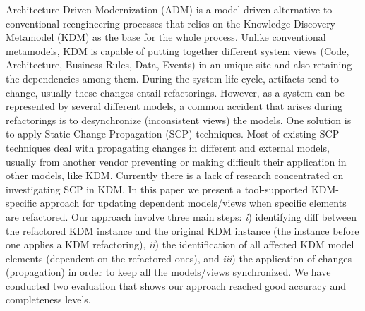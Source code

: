 %
Architecture-Driven Modernization (ADM) is a model-driven alternative to conventional reengineering processes that relies on the Knowledge-Discovery Metamodel (KDM) as the base for the whole process. Unlike conventional metamodels, KDM is capable of putting together different system views (Code, Architecture, Business Rules, Data, Events) in an unique site and also retaining the dependencies among them. During the system life cycle, artifacts tend to change, usually these changes entail refactorings. However, as a system can be represented by several different models, a common accident that arises during refactorings is to desynchronize (inconsistent views) the models. One solution is to apply Static Change Propagation (SCP) techniques. Most of existing SCP techniques deal with propagating changes in different and external models, usually from another vendor preventing or making difficult their application in other models, like KDM. Currently there is a lack of research concentrated on investigating SCP in KDM. In this paper we present a tool-supported KDM-specific approach for updating dependent models/views when specific elements are refactored. Our approach involve three main steps: \textit{i}) identifying diff between the refactored KDM instance and the original KDM instance (the instance before one applies a KDM refactoring), \textit{ii}) the identification of all affected KDM model elements (dependent on the refactored ones), and \textit{iii}) the application of changes (propagation) in order to keep all the models/views synchronized. We have conducted two evaluation that shows our approach reached good accuracy and completeness levels.